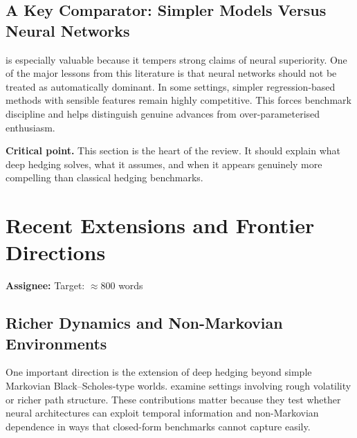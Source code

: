 \documentclass[12pt, a4paper]{article}
\newcommand{\crit}[1]{\noindent\textbf{Critical point.} #1}
\begin{document}
\subsection{A Key Comparator: Simpler Models Versus Neural Networks}
\label{subsec:dh_comparator}

\citet{RufWang2022} is especially valuable because it tempers strong claims of neural
superiority. One of the major lessons from this literature is that neural networks
should not be treated as automatically dominant. In some settings, simpler
regression-based methods with sensible features remain highly competitive. This forces
benchmark discipline and helps distinguish genuine advances from over-parameterised
enthusiasm.

\crit{This section is the heart of the review. It should explain what deep hedging
solves, what it assumes, and when it appears genuinely more compelling than classical
hedging benchmarks.}

\section{Recent Extensions and Frontier Directions}
\label{sec:extensions}

\begin{assignbox}
\textbf{Assignee:} \underline{\hspace{4cm}} \quad Target: $\approx 800$ words
\end{assignbox}


\subsection{Richer Dynamics and Non-Markovian Environments}
\label{subsec:rough_vol}

One important direction is the extension of deep hedging beyond simple Markovian
Black--Scholes-type worlds. \citet{HorvathTeichmannZuric2021} examine settings
involving rough volatility or richer path structure. These contributions matter because
they test whether neural architectures can exploit temporal information and
non-Markovian dependence in ways that closed-form benchmarks cannot capture easily.
\end{document}
